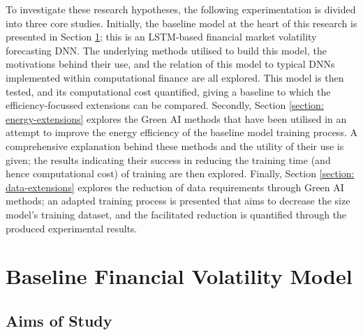 \documentclass[a4paper, 11pt]{report}
\begin{document}
    To investigate these research hypotheses, the following experimentation is divided into three core studies. Initially, the baseline model at the heart of this research is presented in Section \ref{section: baseline}; this is an LSTM-based financial market volatility forecasting DNN. The underlying methods utilised to build this model, the motivations behind their use, and the relation of this model to typical DNNs implemented within computational finance are all explored. This model is then tested, and its computational cost quantified, giving a baseline to which the efficiency-focussed extensions can be compared. Secondly, Section \ref{section: energy-extensions} explores the Green AI methods that have been utilised in an attempt to improve the energy efficiency of the baseline model training process. A comprehensive explanation behind these methods and the utility of their use is given; the results indicating their success in reducing the training time (and hence computational cost) of training are then explored. Finally, Section \ref{section: data-extensions} explores the reduction of data requirements through Green AI methods; an adapted training process is presented that aims to decrease the size model's training dataset, and the facilitated reduction is quantified through the produced experimental results.


    \section{Baseline Financial Volatility Model}
    \label{section: baseline}

    \subsection{Aims of Study}
\end{document}
